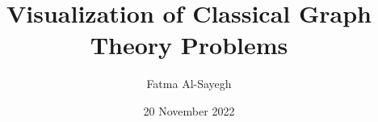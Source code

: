 \documentclass{l4proj}
\begin{document}
\title{Visualization of Classical Graph Theory Problems}
\author{Fatma Al-Sayegh}
\date{20 November 2022}

\maketitle

\begin{abstract}

\end{abstract}


%
%
\def\consentname {Fatma Al-Sayegh} %
\def\consentdate {20 November 2022} %
%
\educationalconsent


\tableofcontents

%
%
%
%
%
%
%
\end{document}
